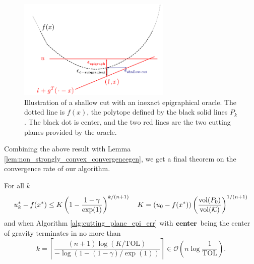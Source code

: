 \begin{figure}
\begin{centering}
\includegraphics[width=0.65\textwidth]{cutting/fig0.pdf}
\par\end{centering}
\caption{Illustration of a shallow cut with an inexact epigraphical oracle. The dotted
line is $f(x)$, the polytope defined by the black solid lines $P_k$. The black
dot is center, and the two red lines are the two cutting planes provided by the 
oracle. \label{fig:shallow-cut}} 
\end{figure}



Combining the above result with Lemma \ref{lem:non_strongly_convex_convergencegen}, we get a final theorem on the convergence rate of our algorithm.
\begin{thm}\label{thm:MIE-convergence}
For all $k$
\[
u_{k}^{*}-f(x^{*})\leq K\left(1-\frac{1-\gamma}{\exp(1)}\right)^{k/(n+1)}\quad K=(u_{0}-f(x^{*}))\left(\frac{\textnormal{vol}(P_{0})}{\textnormal{vol}(\mathcal{K})}\right)^{1/(n+1)}
\]
and when 
Algorithm \ref{alg:cutting_plane_epi_err} with $\mbox{\bf center}$ being the
center of gravity terminates in no more than
\[
k = \left\lceil \frac{(n+1)\log(K/\mbox{TOL})}{-\log(1-(1-\gamma)/\exp(1))} \right\rceil 
\in \mathcal{O}\left(n\log\frac{1}{\mbox{TOL}}\right).
\]

\end{thm} 

